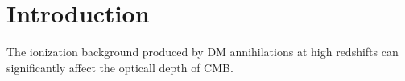 \section{Introduction}

The ionization background produced by DM annihilations at high redshifts can significantly affect the opticall depth of CMB.
